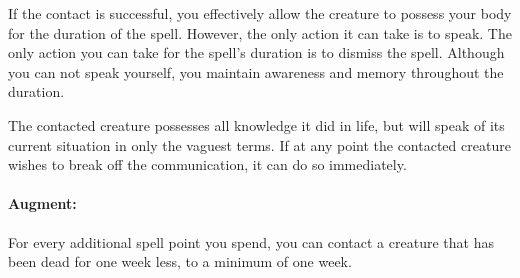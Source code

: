 If the contact is successful, you effectively allow the creature to possess your body for the duration of the spell. However, the only action it can take is to speak. The only action you can take for the spell's duration is to dismiss the spell. Although you can not speak yourself, you maintain awareness and memory throughout the duration.

The contacted creature possesses all knowledge it did in life, but will speak of its current situation in only the vaguest terms. If at any point the contacted creature wishes to break off the communication, it can do so immediately.

\paragraph{Augment:} For every additional spell point you spend, you can contact a creature that has been dead for one week less, to a minimum of one week.